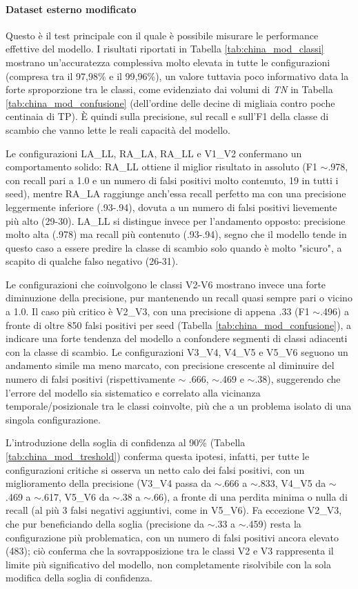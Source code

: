 \paragraph{Dataset esterno modificato}
Questo è il test principale con il quale è possibile misurare le performance effettive del modello.
I risultati riportati in Tabella \ref{tab:china_mod_classi} mostrano un'accuratezza complessiva molto elevata in tutte le configurazioni (compresa tra il 97,98\% e il 99,96\%), un valore tuttavia poco informativo data la forte sproporzione tra le classi, come evidenziato dai volumi di \emph{TN} in Tabella \ref{tab:china_mod_confusione} (dell'ordine delle decine di migliaia contro poche centinaia di TP). È quindi sulla precisione, sul recall e sull'F1 della classe di scambio che vanno lette le reali capacità del modello.

Le configurazioni LA\_LL, RA\_LA, RA\_LL e V1\_V2 confermano un comportamento solido: RA\_LL ottiene il miglior risultato in assoluto (F1 $\sim$.978, con recall pari a 1.0 e un numero di falsi positivi molto contenuto, 19 in tutti i seed), mentre RA\_LA raggiunge anch'essa recall perfetto ma con una precisione leggermente inferiore (.93-.94), dovuta a un numero di falsi positivi lievemente più alto (29-30). LA\_LL si distingue invece per l'andamento opposto: precisione molto alta (.978) ma recall più contenuto (.93-.94), segno che il modello tende in questo caso a essere predire la classe di scambio solo quando è molto "sicuro", a scapito di qualche falso negativo (26-31).

Le configurazioni che coinvolgono le classi V2-V6 mostrano invece una forte diminuzione della precisione, pur mantenendo un recall quasi sempre pari o vicino a 1.0. Il caso più critico è V2\_V3, con una precisione di appena .33 (F1 $\sim$.496) a fronte di oltre 850 falsi positivi per seed (Tabella \ref{tab:china_mod_confusione}), a indicare una forte tendenza del modello a confondere segmenti di classi adiacenti con la classe di scambio. Le configurazioni V3\_V4, V4\_V5 e V5\_V6 seguono un andamento simile ma meno marcato, con precisione crescente al diminuire del numero di falsi positivi (rispettivamente $\sim$ .666, $\sim$.469 e $\sim$.38), suggerendo che l'errore del modello sia sistematico e correlato alla vicinanza temporale/posizionale tra le classi coinvolte, più che a un problema isolato di una singola configurazione.

L'introduzione della soglia di confidenza al 90\% (Tabella \ref{tab:china_mod_treshold}) conferma questa ipotesi, infatti, per tutte le configurazioni critiche si osserva un netto calo dei falsi positivi, con un miglioramento della precisione (V3\_V4 passa da $\sim$.666 a $\sim$.833, V4\_V5 da $\sim$.469 a $\sim$.617, V5\_V6 da $\sim$.38 a $\sim$.66), a fronte di una perdita minima o nulla di recall (al più 3 falsi negativi aggiuntivi, come in V5\_V6). Fa eccezione V2\_V3, che pur beneficiando della soglia (precisione da $\sim$.33 a $\sim$.459) resta la configurazione più problematica, con un numero di falsi positivi ancora elevato (483); ciò conferma che la sovrapposizione tra le classi V2 e V3 rappresenta il limite più significativo del modello, non completamente risolvibile con la sola modifica della soglia di confidenza.

